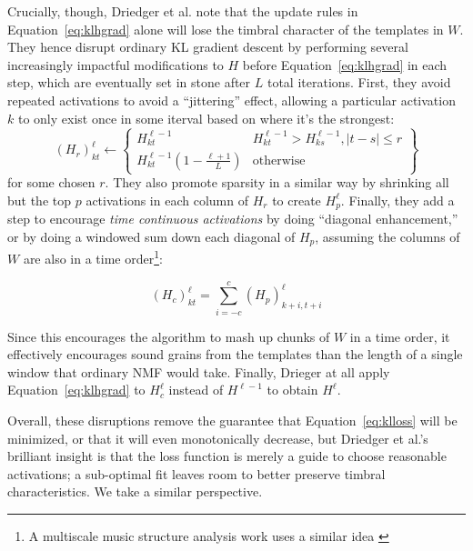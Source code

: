 \documentclass{article}
\begin{document}
Crucially, though, Driedger et al. note that the update rules in Equation~\ref{eq:klhgrad} alone will lose the timbral character of the templates in $W$.  They hence disrupt ordinary KL gradient descent by performing several increasingly impactful modifications to $H$ before Equation~\ref{eq:klhgrad} in each step, which are eventually set in stone after $L$ total iterations.  First, they avoid repeated activations to avoid a ``jittering'' effect, allowing a particular activation $k$ to only exist once in some iterval based on where it's the strongest:
\begin{equation}
    \label{eq:driedgerrepeated}
    (H_r)_{kt}^{\ell} \gets \left\{ \begin{array}{cc} H^{\ell-1}_{kt} & H^{\ell-1}_{kt} > H^{\ell-1}_{ks}, |t - s| \leq r \\ H^{\ell-1}_{kt} (1 - \frac{\ell+1}{L}) & \text{otherwise}  \end{array} \right\}
\end{equation}
for some chosen $r$.  They also promote sparsity in a similar way by shrinking all but the top $p$ activations in each column of $H_r$ to create $H_p^{\ell}$.  Finally, they add a step to encourage {\em time continuous activations} by doing ``diagonal enhancement,'' or by doing a windowed sum down each diagonal of $H_p$, assuming the columns of $W$ are also in a time order\footnote{A multiscale music structure analysis work uses a similar idea \cite{mcfee2014analyzing}}:

\begin{equation}
    \label{eq:driedgertimecontinuous}
    (H_c)_{kt}^{\ell} = \sum_{i=-c}^c (H_p)^{\ell}_{k+i, t+i}
\end{equation}

Since this encourages the algorithm to mash up chunks of $W$ in a time order, it effectively encourages sound grains from the templates than the length of a single window that ordinary NMF would take.  Finally, Drieger at all apply Equation~\ref{eq:klhgrad} to $H_c^{\ell}$ instead of $H^{\ell-1}$ to obtain $H^{\ell}$.

Overall, these disruptions remove the guarantee that Equation~\ref{eq:klloss} will be minimized, or that it will even monotonically decrease, but Driedger et al.'s brilliant insight is that the loss function is merely a guide to choose reasonable activations; a sub-optimal fit leaves room to better preserve timbral characteristics.  We take a similar perspective.
\end{document}
